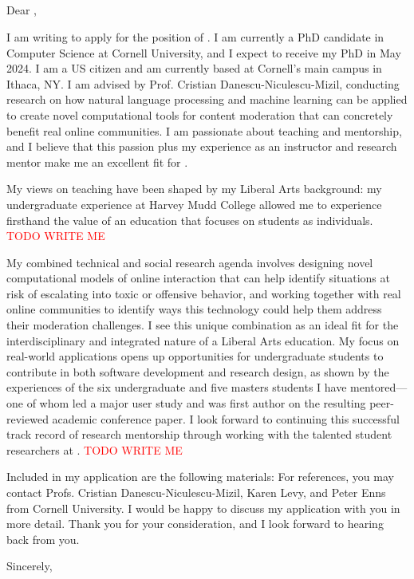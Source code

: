 \documentclass[12pt]{letter}
\begin{document}
\signature{Jonathan P. Chang}
\begin{letter}{
\chairname \\
\chairtitle \\
\department \\
\schoolnamelong \\
\schooladdress
}

\opening{Dear \chairlastname,}

I am writing to apply for the position of \position.
I am currently a PhD candidate in Computer Science at Cornell University, and I expect to receive my PhD in May 2024.
I am a US citizen and am currently based at Cornell's main campus in Ithaca, NY.
I am advised by Prof. Cristian Danescu-Niculescu-Mizil, conducting research on how natural language processing and machine learning can be applied to create novel computational tools for content moderation that can concretely benefit real online communities.
I am passionate about teaching and mentorship, and I believe that this passion plus my experience as an instructor and research mentor make me an excellent fit for \schoolname.

\ifliberalarts
My views on teaching have been shaped by my Liberal Arts background: my undergraduate experience at Harvey Mudd College allowed me to experience firsthand the value of an education that focuses on students as individuals.
\else
\textcolor{red}{TODO WRITE ME}
\fi
\coverteachingpara

\ifliberalarts
My combined technical and social research agenda involves designing novel computational models of online interaction that can help identify situations at risk of escalating into toxic or offensive behavior, and working together with real online communities to identify ways this technology could help them address their moderation challenges.
I see this unique combination as an ideal fit for the interdisciplinary and integrated nature of a Liberal Arts education.
\coverresearchpara
My focus on real-world applications opens up opportunities for undergraduate students to contribute in both software development and research design, as shown by the experiences of the six undergraduate and five masters students I have mentored---one of whom led a major user study and was first author on the resulting peer-reviewed academic conference paper.
I look forward to continuing this successful track record of research mentorship through working with the talented student researchers at \schoolname.
\else
\textcolor{red}{TODO WRITE ME}
\fi

Included in my application are the following materials: \materials
For references, you may contact Profs. Cristian Danescu-Niculescu-Mizil, Karen Levy, and Peter Enns from Cornell University.
I would be happy to discuss my application with you in more detail.
Thank you for your consideration, and I look forward to hearing back from you.

\closing{Sincerely,}

\end{letter}
\end{document}
